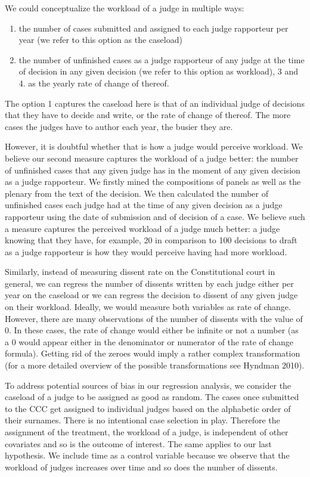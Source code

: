 \documentclass[
  11pt,
]{article}
\providecommand{\tightlist}{%
  \setlength{\itemsep}{0pt}\setlength{\parskip}{0pt}}
\begin{document}
We could conceptualize the workload of a judge in multiple ways:

\begin{enumerate}
\def\labelenumi{\arabic{enumi}.}
\tightlist
\item
  the number of cases submitted and assigned to each judge rapporteur
  per year (we refer to this option as the caseload)
\item
  the number of unfinished cases as a judge rapporteur of any judge at
  the time of decision in any given decision (we refer to this option as
  workload), 3 and 4. as the yearly rate of change of thereof.
\end{enumerate}

The option 1 captures the caseload here is that of an individual judge
of decisions that they have to decide and write, or the rate of change
of thereof. The more cases the judges have to author each year, the
busier they are.

However, it is doubtful whether that is how a judge would perceive
workload. We believe our second measure captures the workload of a judge
better: the number of unfinished cases that any given judge has in the
moment of any given decision as a judge rapporteur. We firstly mined the
compositions of panels as well as the plenary from the text of the
decision. We then calculated the number of unfinished cases each judge
had at the time of any given decision as a judge rapporteur using the
date of submission and of decision of a case. We believe such a measure
captures the perceived workload of a judge much better: a judge knowing
that they have, for example, 20 in comparison to 100 decisions to draft
as a judge rapporteur is how they would perceive having had more
workload.

Similarly, instead of measuring dissent rate on the Constitutional court
in general, we can regress the number of dissents written by each judge
either per year on the caseload or we can regress the decision to
dissent of any given judge on their workload. Ideally, we would measure
both variables as rate of change. However, there are many observations
of the number of dissents with the value of 0. In these cases, the rate
of change would either be infinite or not a number (as a 0 would appear
either in the denominator or numerator of the rate of change formula).
Getting rid of the zeroes would imply a rather complex transformation
(for a more detailed overview of the possible transformations see
Hyndman 2010).

To address potential sources of bias in our regression analysis, we
consider the caseload of a judge to be assigned as good as random. The
cases once submitted to the CCC get assigned to individual judges based
on the alphabetic order of their surnames. There is no intentional case
selection in play. Therefore the assignment of the treatment, the
workload of a judge, is independent of other covariates and so is the
outcome of interest. The same applies to our last hypothesis. We include
time as a control variable because we observe that the workload of
judges increases over time and so does the number of dissents.
\end{document}
